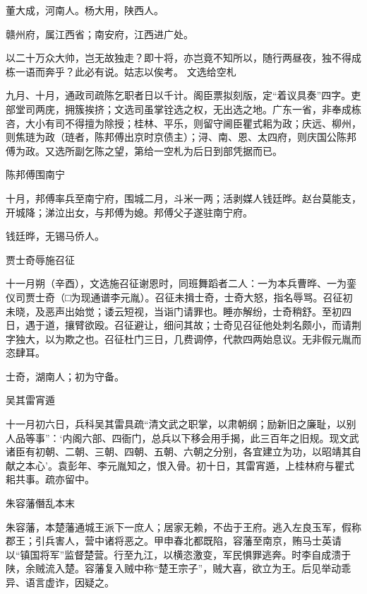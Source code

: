 \documentclass[]{article}
\begin{document}
董大成，河南人。杨大用，陕西人。

赣州府，属江西省；南安府，江西进广处。

以二十万众大帅，岂无故独走？即十将，亦岂竟不知所以，随行两昼夜，独不得成栋一语而奔乎？此必有说。姑志以俟考。
文选给空札

九月、十月，通政司疏陈乞职者日以千计。阁臣票拟刻版，定``着议具奏''四字。吏部堂司两庑，拥簇挨挤；文选司虽掌铨选之权，无出选之地。广东一省，非奉成栋咨，大小有司不得擅为除授；桂林、平乐，则留守阃臣瞿式耜为政；庆远、柳州，则焦琏为政（琏者，陈邦傅出京时京债主）；浔、南、恩、太四府，则庆国公陈邦傅为政。又选所副乞陈之望，第给一空札为后日到部凭据而已。

陈邦傅围南宁

十月，邦傅率兵至南宁府，围城二月，斗米一两；活剥媒人钱廷晔。赵台莫能支，开城降；涕泣出女，与邦傅为媳。邦傅父子遂驻南宁府。

钱廷晔，无锡马侨人。

贾士奇辱施召征

十一月朔（辛酉），文选施召征谢恩时，同班舞蹈者二人：一为本兵曹晔、一为銮仪司贾士奇（□为现通谱李元胤）。召征未揖士奇，士奇大怒，指名辱骂。召征初未晓，及恶声出始觉；诿云短视，当诣门请罪也。睡亦解纷，士奇稍舒。至初四日，遇于道，攘臂欲殴。召征避让，细问其故；士奇见召征他处刺名颇小，而请荆字独大，以为欺之也。召征杜门三日，几费调停，代款四两始息议。无非假元胤而恣肆耳。

士奇，湖南人；初为守备。

吴其雷宵遁

十一月初六日，兵科吴其雷具疏``清文武之职掌，以肃朝纲；励新旧之廉耻，以别人品等事''：`内阁六部、四衙门，总兵以下移会用手揭，此三百年之旧规。现文武诸臣有初朝、二朝、三朝、四朝、五朝、六朝之分别，各宜建立为功，以昭靖其自献之本心'。袁彭年、李元胤知之，恨入骨。初十日，其雷宵遁，上桂林府与瞿式耜共事。疏亦留中。

朱容藩僭乱本末

朱容藩，本楚藩通城王派下一庶人；居家无赖，不齿于王府。逃入左良玉军，假称郡王；引兵害人，营中诸将恶之。甲申春北都既陷，容藩至南京，贿马士英请以``镇国将军''监督楚营。行至九江，以横恣激变，军民惧罪逃奔。时李自成溃于陕，余贼流入楚。容藩复入贼中称``楚王宗子''，贼大喜，欲立为王。后见举动乖异、语言虚诈，因疑之。
\end{document}
